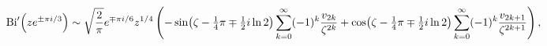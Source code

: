 \[\mathop{\mathrm{Bi}\/}\nolimits'\!\left(ze^{\pm\pi i/3}\right)\mathrel{\sim}%
\sqrt{\frac{2}{\pi}}e^{\mp\pi i/6}z^{1/4}\*\left(-\mathop{\sin\/}\nolimits\!%
\left(\zeta-\tfrac{1}{4}\pi\mp\tfrac{1}{2}i\mathop{\ln\/}\nolimits 2\right)%
\sum_{k=0}^{\infty}(-1)^{k}\frac{v_{2k}}{\zeta^{2k}}+\mathop{\cos\/}\nolimits%
\!\left(\zeta-\tfrac{1}{4}\pi\mp\tfrac{1}{2}i\mathop{\ln\/}\nolimits 2\right)%
\sum_{k=0}^{\infty}(-1)^{k}\frac{v_{2k+1}}{\zeta^{2k+1}}\right),\]